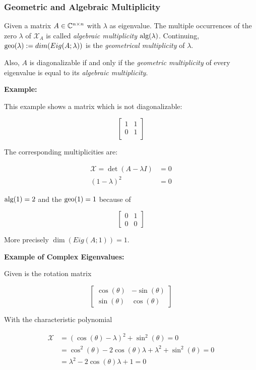 \subsubsection{Geometric and Algebraic Multiplicity}

Given a matrix \(A \in \mathbb{C}^{n \times n}\) with \(\lambda\) as eigenvalue. The multiple occurrences 
of the zero \(\lambda\) of \(\mathcal{X}_A\) is called \emph{algebraic multiplicity} \(\text{alg}(\lambda)\). 
Continuing, \(\text{geo}(\lambda):= dim(Eig(A;\lambda))\) is the \emph{geometrical multiplicity} of \(\lambda\).

Also, \(A\) is diagonalizable if and only if the \emph{geometric multiplicity} of every eigenvalue is equal 
to its \emph{algebraic multiplicity}.

\textbf{Example:}

This example shows a matrix which is not diagonalizable:

\[
    \begin{bmatrix}
        1 & 1 \\
        0 & 1 \\
    \end{bmatrix}
\]

The corresponding multiplicities are:

\begin{align*}
    \mathcal{X} =\det (A - \lambda I) &= 0 \\
    (1 - \lambda)^2 &= 0
\end{align*}

\(\text{alg}(1)= 2\) and the \(\text{geo}(1) = 1\) because of 

\[
    \begin{bmatrix}
        0 & 1 \\
        0 & 0
    \end{bmatrix}
\]

More precisely \(\dim(Eig(A;1)) = 1\).

\textbf{Example of Complex Eigenvalues:}

Given is the rotation matrix

\[
    \begin{bmatrix}
        \cos(\theta) & -\sin(\theta) \\
        \sin(\theta) & \cos(\theta)
    \end{bmatrix}
\]

With the characteristic polynomial 

\begin{align*}
    \mathcal{X} &= (\cos(\theta)- \lambda)^2 + \sin^2(\theta) = 0\\
    &= \cos^2(\theta) - 2\cos(\theta)\lambda + \lambda^2 + \sin^2(\theta) = 0 \\
    &= \lambda^2 -2\cos(\theta)\lambda + 1 = 0 \\
\end{align*}

